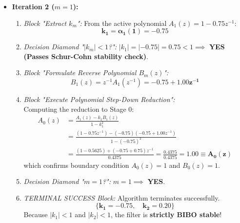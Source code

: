 \documentclass[11pt,a4paper]{article}
\begin{document}
\begin{itemize}
    \item \textbf{Iteration 2 ($m = 1$):}
    \begin{enumerate}
        \item \textit{Block "Extract $k_m$":}
        From the active polynomial $A_1(z) = 1 - 0.75 z^{-1}$:
        $$\mathbf{k_1 = \alpha_1(1) = -0.75}$$
        \item \textit{Decision Diamond "$|k_m| < 1$?":}
        $|k_1| = |-0.75| = 0.75 < 1 \implies$ \textbf{YES (Passes Schur-Cohn stability check)}.
        \item \textit{Block "Formulate Reverse Polynomial $B_m(z)$":}
        $$B_1(z) = z^{-1} A_1(z^{-1}) = \mathbf{-0.75 + 1.00 z^{-1}}$$
        \item \textit{Block "Execute Polynomial Step-Down Reduction":}\\
        Computing the reduction to Stage 0:
        \begin{align}
        A_0(z) &= \frac{A_1(z) - k_1 B_1(z)}{1 - k_1^2} \nonumber \\
        &= \frac{(1 - 0.75 z^{-1}) - (-0.75)(-0.75 + 1.00 z^{-1})}{1 - (-0.75)^2} \nonumber \\
        &= \frac{(1 - 0.5625) + (-0.75 + 0.75) z^{-1}}{0.4375} = \frac{0.4375}{0.4375} = \mathbf{1.00 \equiv A_0(z)}
        \end{align}
        which confirms boundary condition $A_0(z) = 1$ and $B_0(z) = 1$.
        \item \textit{Decision Diamond "$m = 1$?":}
        $m = 1 \implies$ \textbf{YES}.
        \item \textit{TERMINAL SUCCESS Block:}
        Algorithm terminates successfully.
        $$\mathbf{\{k_1 = -0.75, \quad k_2 = 0.20\}}$$
        Because $|k_1| < 1$ and $|k_2| < 1$, the filter is \textbf{strictly BIBO stable}!
    \end{enumerate}
\end{itemize}

\newpage
\end{document}
